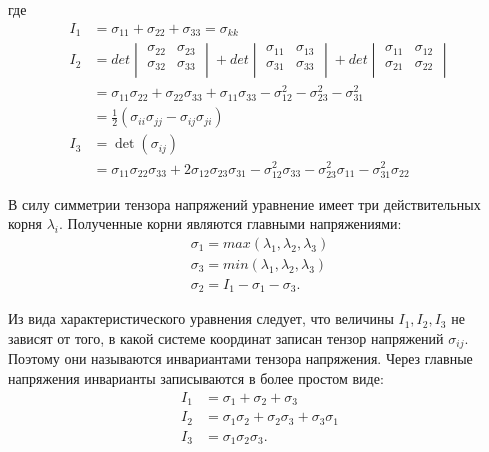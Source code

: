 где
\begin{eqnarray}
I_1 &= \sigma_{11}+\sigma_{22}+\sigma_{33} = \sigma_{kk} \\ 
I_2 &= det\begin{vmatrix} \sigma_{22} & \sigma_{23} \\ \sigma_{32} & \sigma_{33} \\ \end{vmatrix} + det\begin{vmatrix} \sigma_{11} & \sigma_{13} \\ \sigma_{31} & \sigma_{33} \\ \end{vmatrix} + det\begin{vmatrix} \sigma_{11} & \sigma_{12} \\ \sigma_{21} & \sigma_{22} \\ \end{vmatrix} \\ 
&= \sigma_{11}\sigma_{22}+\sigma_{22}\sigma_{33}+\sigma_{11}\sigma_{33}-\sigma_{12}^2-\sigma_{23}^2-\sigma_{31}^2 \\ 
&= \frac{1}{2}\left(\sigma_{ii}\sigma_{jj}-\sigma_{ij}\sigma_{ji}\right) \\ 
I_3 &= \det(\sigma_{ij}) \\ 
&= \sigma_{11}\sigma_{22}\sigma_{33}+2\sigma_{12}\sigma_{23}\sigma_{31}-\sigma_{12}^2\sigma_{33}-\sigma_{23}^2\sigma_{11}-\sigma_{31}^2\sigma_{22}
\end{eqnarray}

В силу симметрии тензора напряжений уравнение имеет три действительных корня $\lambda_i$. Полученные корни являются главными напряжениями:
\begin{eqnarray}
\sigma_1 = max \left( \lambda_1,\lambda_2,\lambda_3 \right) \\
\sigma_3 = min \left( \lambda_1,\lambda_2,\lambda_3 \right) \\
\sigma_2=I_1-\sigma_1-\sigma_3.
\end{eqnarray}

Из вида характеристического уравнения следует, что величины $I_1, I_2, I_3$ не зависят от того, в какой системе координат записан тензор напряжений $\sigma_{ij}$. Поэтому они называются инвариантами тензора напряжения. Через главные напряжения инварианты записываются в более простом виде:
\begin{eqnarray}
I_1 &= \sigma_{1}+\sigma_{2}+\sigma_{3} \\ 
I_2 &= \sigma_{1}\sigma_{2}+\sigma_{2}\sigma_{3}+\sigma_{3}\sigma_{1} \\ 
I_3 &= \sigma_{1}\sigma_{2}\sigma_{3}.
\end{eqnarray}

